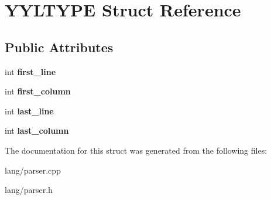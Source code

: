 \hypertarget{structYYLTYPE}{}\section{Y\+Y\+L\+T\+Y\+PE Struct Reference}
\label{structYYLTYPE}
\subsection*{Public Attributes}
\begin{DoxyCompactItemize}
\item 
\mbox{\label{structYYLTYPE_a50ad3435eaea74bcab6f1ae5fbaefd89}} 
int {\bfseries first\+\_\+line}
\item 
\mbox{\label{structYYLTYPE_a3a556533babab1b9066fa9bdbb809210}} 
int {\bfseries first\+\_\+column}
\item 
\mbox{\label{structYYLTYPE_a3075f2bc3448df5d2a9f16d22bff2cc1}} 
int {\bfseries last\+\_\+line}
\item 
\mbox{\label{structYYLTYPE_acf87f8c98686f286eaf700c4b62157b2}} 
int {\bfseries last\+\_\+column}
\end{DoxyCompactItemize}


The documentation for this struct was generated from the following files\+:\begin{DoxyCompactItemize}
\item 
lang/parser.\+cpp\item 
lang/parser.\+h\end{DoxyCompactItemize}
